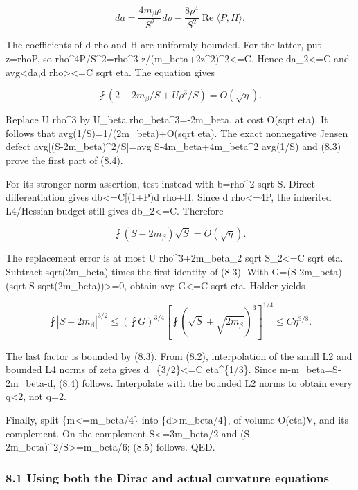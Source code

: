 \documentclass[
  10pt,
]{article}
\begin{document}
\[
 da=\frac{4m_\beta\rho}{S^2}d\rho
       -\frac{8\rho^4}{S^2}\operatorname{Re}\langle P,H\rangle.
\]

The coefficients of d rho and H are uniformly bounded. For the latter,
put z=rho\textbar P\textbar, so
rho\^{}4\textbar P\textbar/S\^{}2=rho\^{}3
z/(m\_beta+2z\^{}2)\^{}2\textless=C. Hence
\textbar\textbar da\textbar\textbar\_2\textless=C and
\textbar avg\textless da,d rho\textgreater\textbar\textless=C sqrt eta.
The equation gives

\[
 \fint(2-2m_\beta/S+U\rho^3/S)=O(\sqrt\eta).
\]

Replace U rho\^{}3 by U\_beta rho\_beta\^{}3=-2m\_beta, at cost O(sqrt
eta). It follows that avg(1/S)=1/(2m\_beta)+O(sqrt eta). The exact
nonnegative Jensen defect avg{[}(S-2m\_beta)\^{}2/S{]}=avg
S-4m\_beta+4m\_beta\^{}2 avg(1/S) and (8.3) prove the first part of
(8.4).

For its stronger norm assertion, test instead with b=rho\^{}2 sqrt S.
Direct differentiation gives
\textbar db\textbar\textless=C{[}(1+\textbar P\textbar)\textbar d
rho\textbar+\textbar H\textbar{]}. Since \textbar d
rho\textbar\textless=4\textbar P\textbar, the inherited L4/Hessian
budget still gives \textbar\textbar db\textbar\textbar\_2\textless=C.
Therefore

\[
 \fint(S-2m_\beta)\sqrt S=O(\sqrt\eta).
\]

The replacement error is at most \textbar\textbar U
rho\^{}3+2m\_beta\textbar\textbar\_2 \textbar\textbar sqrt
S\textbar\textbar\_2\textless=C sqrt eta. Subtract sqrt(2m\_beta) times
the first identity of (8.3). With G=(S-2m\_beta)(sqrt
S-sqrt(2m\_beta))\textgreater=0, obtain avg G\textless=C sqrt eta.
Holder yields

\[
 \fint|S-2m_\beta|^{3/2}
 \le(\fint G)^{3/4}
       [\fint(\sqrt S+\sqrt{2m_\beta})^3]^{1/4}
 \le C\eta^{3/8}.
\]

The last factor is bounded by (8.3). From (8.2), interpolation of the
small L2 and bounded L4 norms of zeta gives
\textbar\textbar d\textbar\textbar\_\{3/2\}\textless=C eta\^{}\{1/3\}.
Since m-m\_beta=S-2m\_beta-d, (8.4) follows. Interpolate with the
bounded L2 norms to obtain every q\textless2, not q=2.

Finally, split \{m\textless=m\_beta/4\} into
\{d\textgreater m\_beta/4\}, of volume O(eta)V, and its complement. On
the complement S\textless=3m\_beta/2 and
(S-2m\_beta)\^{}2/S\textgreater=m\_beta/6; (8.5) follows. QED.

\hypertarget{using-both-the-dirac-and-actual-curvature-equations}{%
\subsubsection{8.1 Using both the Dirac and actual curvature
equations}\label{using-both-the-dirac-and-actual-curvature-equations}}
\end{document}
